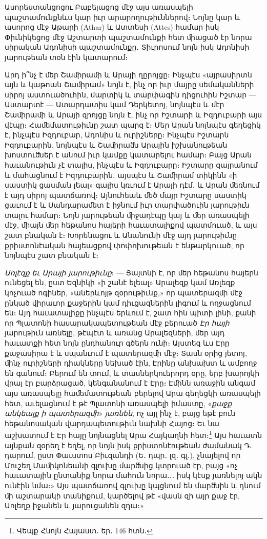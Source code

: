 \documentclass{article}
\begin{document}
{Ասորեստանցոցու Բաբելացոց մէջ այս առասպելի պաշտամունքնևս կար իւր արարողութիւններով։ Նոյնը կար և ասորոց մէջ Աթարի (Athar) և Ատտեսի (Attes) համար իսկ Փիւնիկեցոց մէջ Աշտարտի պաշտամունքի հետ ﬕացած էր նորա սիրական Ադոնիսի պաշտամունքը․ Տիւրոսում նոյն իսկ Ադոնիսի յարութեան տօն էին կատարում։

Արդ ի՞նչ է ﬔր Շաﬕրաﬕ և Արայի ղըրոյցը։ Ինչպէս «այրասիրտն այն և կաթոան Շաﬕրամ» նոյն է, ինչ որ իւր մայրը սեմականների սիրոյ աստուածուհին, մարտիկ և տարփագին դիցուհին Իշտար — Աստարտէ — Ատարդատիս կամ Դերկետոյ, նոյնպէս և մէր Շաﬕրաﬕ և Արայի զրոյցը նոյն է, ինչ որ Իշտարի և Իզդուբարի այս վէպը։ Հաﬔմատութիւնը շատ պարզ է։ Մեր Արան նոյնպէս գեղեցիկ է, ինչպէս Իզդուբար, Ադոնիս և ուրիշները։ Ինչպէս Իշտարն Իզդուբարին, նոյնպէս և Շաﬕրաﬓ Արային իշխանութեան խոստուﬓեր է անում իւր կամքը կատարելու համար։ Բայց Արան հաւանութիւն չէ տալիս, ինչպէս և Իզդուբարը։ Իշտարը զայրանում և մահացնում է Իզդուբարին․ այսպէս և Շաﬕրամ տիկինն «ի սաստիկ ցասման լեալ» գալիս կռւում է Արայի դէմ․ և Արան ﬔռնում է այդ սիրոյ պատճառով։ Այնուհեաև ﬔծ մայր Իշտարը սաստիկ ցաւում է և Սանդարաﬔտ է իջնում իւր տարփածուին յարութիւն տալու համար։ Նոյն յարութեան ﬕջադէպը կայ և ﬔր առասպելի մէջ, ﬕայն ﬔր հեթանոս հայերի հաւատալիքով պատմուած, և այս շատ բնական է։ Խորենացու և Անանունի մէջ այդ յարութիւնը քրիստոնէական հայեացքով փոփոխութեան է ենթարկուած, որ նոյնպէս շատ բնական է։

\emph{Առլէզք եւ Արայի յարութիւնը}։ — Յայտնի է, որ ﬔր հեթանոս հայերն ունեցել են, ըստ Եզնիկի «ի շանէ ելեալ» Արալեզք կամ Առլեզք կոչուած ոգիներ, «աներևոյթ զօրութիւնք,» որ պատերազﬕ մէջ ընկած վիրաւոր քաջերին կամ դիւցազներին լիգում և ողջացնում են։ Այդ հաւատալիքը ինչպէս երևում է, շատ հին պիտի լինի, քանի որ Պլատոնի հասարակապետութեան մէջ բերուած \emph{Էր հայի} յարութիւն առնելը, թէպէտ և առանց Արալեզների, ﬔր այդ հաւատքի հետ նոյն ընդհանուր գծերն ունի։ Այստեզ ևս Էրը քաջասիրա է և սպանւում է պատերազﬕ մէջ։ Տասն օրից յետոյ, ﬕնչ ուրիշների դիակները նեխած էին, Էրինը անխախտ և ամբողջ են գանում։ Բերում են տում, և տասներկուերորդ օրը, երբ խարոյկի վրայ էր բարձրացած, կենգանանում է Էրը։ Էﬕնն առաջին անգամ այս առասպելը հաﬔմատութեան բերելով Արա գեղեցկի առասպելի հետ, աւելացնում է թէ Պլատոնի առասպելի իմաստը, «\emph{քաջք անկեալք ի պատերազﬕ}» \emph{յառնեն}, ոչ այլ ինչ է, բայց եթէ բուն հեթանոսական վարդապետութիւն նախնի Հայոց։ Եւ նա աշխատում է Էր հայը նոյնացնել Արա Հայկաղնի հետ։\footnote{Վեպք Հնոյն Հայաստ․ եր․ 146 հտն․} Այս հաւատն այնքան զօրեղ է եղել, որ նոյն իսկ քրիստոնէութեան ժամանակ Դ․ դարում, ըստ Փաւստոս Բիւզանդի (Ե․ դպր․ լզ․ գլ․), չնայելով որ Մուշեղ Մաﬕկոնեանի գլուխը մարﬓից կտրուած էր, բայց «ոչ հաւատային ընտանիք նորա մահուն նորա․․․ իսկ կէսք յառնելոյ ակն ունէին նմա։» Այս պատճառով գլուխը կպցնում են մարﬓին և դնում ﬕ աշտարակի տանիքում, կարծելով թէ «վասն զի այր քաջ էր, Աոլեղք իջանեն և յարուցանեն զդա։»

}
\end{document}
